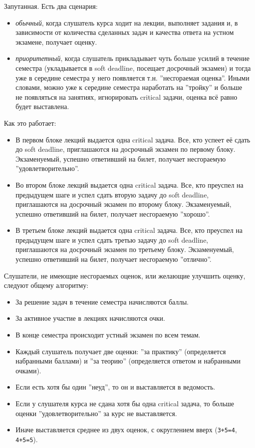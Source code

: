\documentclass[a4paper, 12pt]{extarticle}
\begin{document}
Запутанная. Есть два сценария:
\begin{itemize} 
 \item \textit{обычный}, когда слушатель курса ходит на лекции, выполняет задания и, в зависимости от количества сделанных задач и качества ответа на устном экзамене, получает оценку.
 \item \textit{приоритетный}, когда слушатель прикладывает чуть больше усилий в течение семестра (укладывается в soft deadline, посещает досрочный экзамен) и тогда уже в середине семестра у него появляется т.н. ''несгораемая оценка''. Иными словами, можно уже к середине семестра наработать на ''тройку'' и больше не появляться на занятиях, игнорировать critical задачи, оценка всё равно будет выставлена.
\end{itemize}

Как это работает:

\begin{itemize}

\item В первом блоке лекций выдается одна critical задача. Все, кто успеет её сдать до soft deadline, приглашаются на досрочный экзамен по первому блоку. Экзаменуемый, успешно ответивший на билет, получает несгораемую ''удовлетворительно''.

\item Во втором блоке лекций выдается одна critical задача. Все, кто преуспел на предыдущем шаге и успел сдать вторую задачу до soft deadline, приглашаются на досрочный экзамен по второму блоку. Экзаменуемый, успешно ответивший на билет, получает несгораемую ''хорошо''.

\item В третьем блоке лекций выдается одна critical задача. Все, кто преуспел на предыдущем шаге и успел сдать третью задачу до soft deadline, приглашаются на досрочный экзамен по третьему блоку. Экзаменуемый, успешно ответивший на билет, получает несгораемую ''отлично''.

\end{itemize}

Слушатели, не имеющие несгораемых оценок, или желающие улучшить оценку, следуют общему алгоритму:

\begin{itemize}	
	\item За решение задач в течение семестра начисляются баллы.
	\item За активное участие в лекциях начисляются очки.
	\item В конце семестра происходит устный экзамен по всем темам.
	\item Каждый слушатель получает две оценки: ''за практику'' (определяется набранными баллами) и ''за теорию'' (определяется ответом и набранными очками).
	\item Если есть хотя бы один ''неуд'', то он и выставляется в ведомость. 
	\item Если у слушателя курса не сдана хотя бы одна critical задача, то больше оценки ''удовлетворительно'' за курс не выставляется.
	\item Иначе выставляется среднее из двух оценок, с округлением вверх (\texttt{3+5=4}, \texttt{4+5=5}).
\end{itemize}
\end{document}
